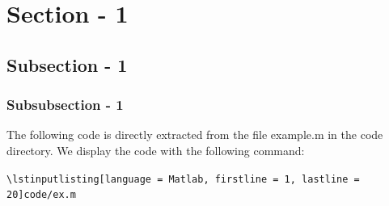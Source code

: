 \documentclass[../main.tex]{subfiles}
\begin{document}
\clearpage
\thispagestyle{empty}


\section{Section - 1}

\subsection{Subsection - 1}

\subsubsection{Subsubsection - 1}

The following code is directly extracted from the file example.m in the code directory.
We display the code with the following command:

\begin{center}
	\texttt{\textbackslash lstinputlisting[language = Matlab, firstline = 1, lastline = 20]{code/ex.m}}
\end{center}


\end{document}
